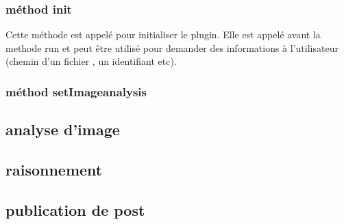 \documentclass[a4paper , 12pt]{article}
\begin{document}
  \subsubsection*{méthod init}
  Cette méthode est appelé pour initialiser le plugin. Elle est appelé avant la methode run et peut être utilisé pour demander des informations à l'utilisateur (chemin d'un fichier , un identifiant etc).

  \subsubsection*{méthod setImageanalysis}
  
  \subsection{analyse d'image}
 
  \subsection{raisonnement}
 
  \subsection{publication de post}
  
\end{document}
